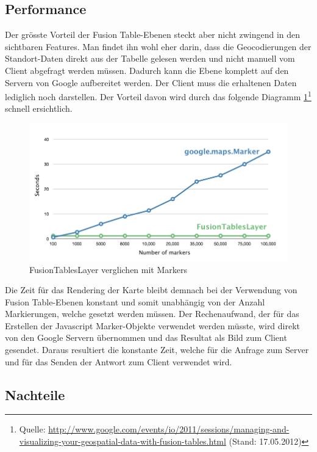\subsection{Performance}
Der grösste Vorteil der Fusion Table-Ebenen steckt aber nicht zwingend in den sichtbaren Features. Man findet ihn wohl eher darin, dass die Geocodierungen der Standort-Daten direkt aus der Tabelle gelesen werden und nicht manuell vom Client abgefragt werden müssen. Dadurch kann die Ebene komplett auf den Servern von Google aufbereitet werden. Der Client muss die erhaltenen Daten lediglich noch darstellen. Der Vorteil davon wird durch das folgende Diagramm \ref{fusiontableslayer-compare_markers}\footnote{Quelle: \url{http://www.google.com/events/io/2011/sessions/managing-and-visualizing-your-geospatial-data-with-fusion-tables.html} (Stand: 17.05.2012)} schnell ersichtlich.

\begin{figure}[!h]
	\centering
	\includegraphics[scale=0.5]{images/einfuehrung/gmap_fusiontableslayer_vs_markers.png}
	\caption{FusionTablesLayer verglichen mit Markers}
	\label{fusiontableslayer-compare_markers}
\end{figure}

Die Zeit für das Rendering der Karte bleibt demnach bei der Verwendung von Fusion Table-Ebenen konstant und somit unabhängig von der Anzahl Markierungen, welche gesetzt werden müssen. Der Rechenaufwand, der für das Erstellen der Javascript Marker-Objekte verwendet werden müsste, wird direkt von den Google Servern übernommen und das Resultat als Bild zum Client gesendet. Daraus resultiert die konstante Zeit, welche für die Anfrage zum Server und für das Senden der Antwort zum Client verwendet wird.

\subsection{Nachteile}
